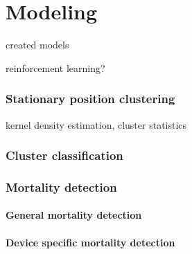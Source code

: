 
\chapter{Modeling}

created models

reinforcement learning?

\subsection{Stationary position clustering}

kernel density estimation, cluster statistics

\subsection{Cluster classification}

\subsection{Mortality detection}

\subsubsection{General mortality detection}

\subsubsection{Device specific mortality detection}
